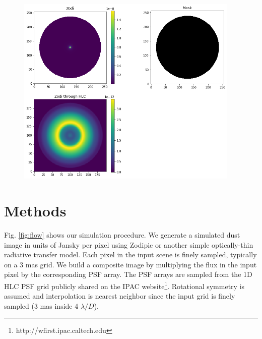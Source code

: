 \documentclass[]{spie}  %
\begin{document}
    \begin{figure}[htbp]

    \centering
    \includegraphics[width=0.95\textwidth]{Unknown-7.png}
    \caption{}
    \label{fig:gap}
\end{figure}


\section{Methods}
\label{sec:intro}  %
Fig. \ref{fig:flow} shows our simulation procedure. 
We generate a simulated dust image in units of Jansky per pixel using Zodipic\cite{kuchner_zodipic_2012} or another simple optically-thin radiative transfer model.
Each pixel in the input scene is finely sampled, typically on a 3 mas grid.  
We build a composite image by multiplying the flux in the input pixel by the corresponding PSF array.
The PSF arrays are sampled from the 1D \gls{HLC} \gls{PSF} grid publicly shared on the IPAC website\footnote{http://wfirst.ipac.caltech.edu}.
Rotational symmetry is assumed and interpolation is  nearest neighbor since the input grid is finely sampled (3 mas inside 4 $\lambda/D$).
\end{document}
